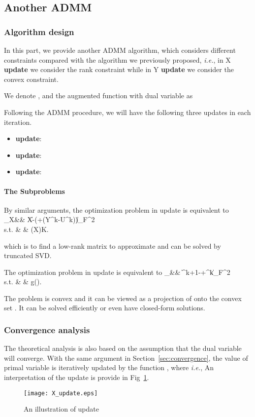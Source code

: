 \subsection{Another ADMM}\label{sec:otherorder}
\subsubsection{Algorithm design}
In this part, we provide another ADMM algorithm, which considers different constraints compared with the algorithm we previously proposed, \textit{i.e.}, in X \textbf{update} we consider the rank constraint while in Y \textbf{update} we consider the convex constraint.

We denote ,  and the augmented function with dual variable  as

Following the ADMM procedure, we will have the following three updates in each iteration.
\begin{itemize}
\item  \textbf{update}:

\item  \textbf{update}:

\item  \textbf{update}:

\end{itemize}

\paragraph{The Subproblems}
By similar arguments, the optimization problem in  update is equivalent to
\label{prob:ADMM}
\min_{X}&& \|X-\left(+(Y^k-U^k)\right)\|_F^2
\nonumber\\
\textrm{s.t.}
& & (X)\leq K.\nonumber

which is to find a low-rank matrix to approximate  and can be solved by truncated SVD.

The optimization problem in  update is equivalent to
\label{prob:ADMM_Y}
 \min_{}&& \|^{k+1}-+^k\|_F^2
\nonumber\\
\textrm{s.t.}
& & g().\nonumber


The problem is convex and it can be viewed as a projection of  onto the convex set . It can be solved efficiently or even have closed-form solutions.

\subsubsection{Convergence analysis}
The theoretical analysis is also based on the assumption that the dual variable will converge. With the same argument in Section~\ref{sec:convergence}, the value of primal variable is iteratively updated by the function , where
 \textit{i.e.},  An interpretation of the update is provide in Fig~\ref{fig:X_update}.
\begin{figure}
  \centering
\texttt{[image: X\_update.eps]}\\
  \caption{An illustration of  update}\label{fig:X_update}
\end{figure}



